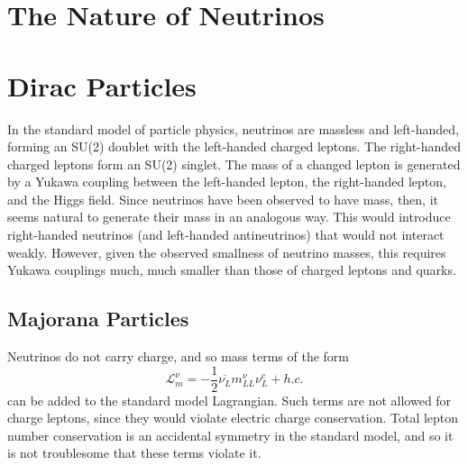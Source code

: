 \documentclass[herrin-thesis.tex]{subfiles}
\begin{document}
\section{The Nature of Neutrinos}
\section{Dirac Particles}
In the standard model of particle physics, neutrinos are massless and left-handed, forming an SU(2) doublet with the left-handed charged leptons. The right-handed charged leptons form an SU(2) singlet. The mass of a changed lepton is generated by a Yukawa coupling between the left-handed lepton, the right-handed lepton, and the Higgs field. Since neutrinos have been observed to have mass, then, it seems natural to generate their mass in an analogous way. This would introduce right-handed neutrinos (and left-handed antineutrinos) that would not interact weakly. However, given the observed smallness of neutrino masses, this requires Yukawa couplings much, much smaller than those of charged leptons and quarks.

\subsection{Majorana Particles}
Neutrinos do not carry charge, and so mass terms of the form
\begin{equation}
\mathcal{L}_{m}^{\nu} = -\frac{1}{2}\overline{\nu_{L}} m_{L L}^{\nu} \nu_{L}^{c} +h.c.
\label{eq:nu_majorana_lagrangian}
\end{equation}
can be added to the standard model Lagrangian. Such terms are not allowed for charge leptons, since they would violate electric charge conservation. Total lepton number conservation is an accidental symmetry in the standard model, and so it is not troublesome that these terms violate it.
\end{document}
